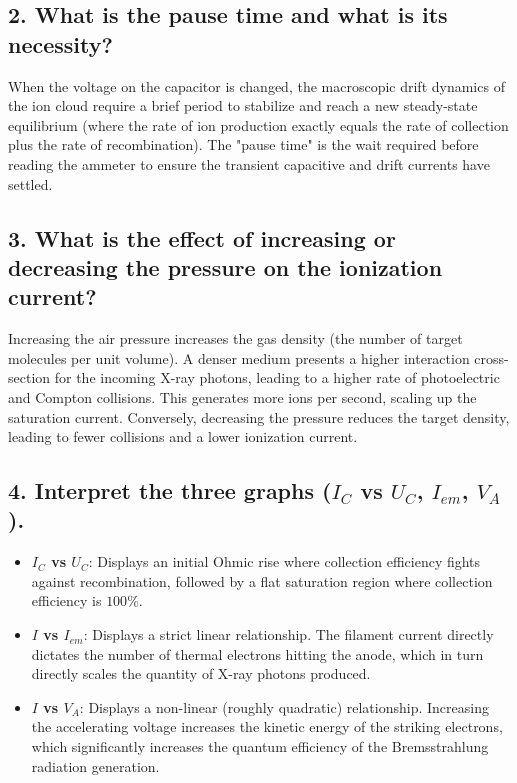 \documentclass[a4paper,11pt]{article}
\begin{document}
\subsection*{2. What is the pause time and what is its necessity?}
When the voltage on the capacitor is changed, the macroscopic drift dynamics of the ion cloud require a brief period to stabilize and reach a new steady-state equilibrium (where the rate of ion production exactly equals the rate of collection plus the rate of recombination). The "pause time" is the wait required before reading the ammeter to ensure the transient capacitive and drift currents have settled.

\subsection*{3. What is the effect of increasing or decreasing the pressure on the ionization current?}
Increasing the air pressure increases the gas density (the number of target molecules per unit volume). A denser medium presents a higher interaction cross-section for the incoming X-ray photons, leading to a higher rate of photoelectric and Compton collisions. This generates more ions per second, scaling up the saturation current. Conversely, decreasing the pressure reduces the target density, leading to fewer collisions and a lower ionization current.

\subsection*{4. Interpret the three graphs ($I_C$ vs $U_C$, $I_{em}$, $V_A$).}
\begin{itemize}
    \item \textbf{$I_C$ vs $U_C$}: Displays an initial Ohmic rise where collection efficiency fights against recombination, followed by a flat saturation region where collection efficiency is $100\%$.
    \item \textbf{$I$ vs $I_{em}$}: Displays a strict linear relationship. The filament current directly dictates the number of thermal electrons hitting the anode, which in turn directly scales the quantity of X-ray photons produced.
    \item \textbf{$I$ vs $V_A$}: Displays a non-linear (roughly quadratic) relationship. Increasing the accelerating voltage increases the kinetic energy of the striking electrons, which significantly increases the quantum efficiency of the Bremsstrahlung radiation generation.
\end{itemize}
\end{document}
